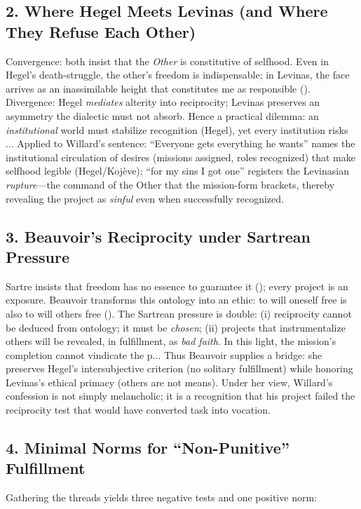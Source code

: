 \subsection*{2. Where Hegel Meets Levinas (and Where They Refuse Each Other)}
\label{ssec:2-where-hegel-meets-levinas-and-where-they-refuse-each-other}
Convergence: both insist that the \emph{Other} is constitutive of selfhood. Even in Hegel’s death-struggle, the other’s freedom is indispensable; in Levinas, the face arrives as an inassimilable height that constitutes me as responsible (\parencite{LevinasTI1969}). Divergence: Hegel \emph{mediates} alterity into reciprocity; Levinas preserves an asymmetry the dialectic must not absorb. Hence a practical dilemma: an \emph{institutional} world must stabilize recognition (Hegel), yet every institution risks ...
Applied to Willard’s sentence: ``Everyone gets everything he wants'' names the institutional circulation of desires (missions assigned, roles recognized) that make selfhood legible (Hegel/Koj{\`e}ve); ``for my sins I got one'' registers the Levinasian \emph{rupture}---the command of the Other that the mission-form brackets, thereby revealing the project as \emph{sinful} even when successfully recognized.

\subsection*{3. Beauvoir’s Reciprocity under Sartrean Pressure}
\label{ssec:3-beauvoir-s-reciprocity-under-sartrean-pressure}
Sartre insists that freedom has no essence to guarantee it (\parencite{SartreBN2003}); every project is an exposure. Beauvoir transforms this ontology into an ethic: to will oneself free is also to will others free (\parencite{Beauvoir1976}). The Sartrean pressure is double: (i) reciprocity cannot be deduced from ontology; it must be \emph{chosen}; (ii) projects that instrumentalize others will be revealed, in fulfillment, as \emph{bad faith}. In this light, the mission’s completion cannot vindicate the p...
Thus Beauvoir supplies a bridge: she preserves Hegel’s intersubjective criterion (no solitary fulfillment) while honoring Levinas’s ethical primacy (others are not means). Under her view, Willard’s confession is not simply melancholic; it is a recognition that his project failed the reciprocity test that would have converted task into vocation.

\subsection*{4. Minimal Norms for ``Non-Punitive'' Fulfillment}
\label{ssec:4-minimal-norms-for-non-punitive-fulfillment}
Gathering the threads yields three negative tests and one positive norm:

